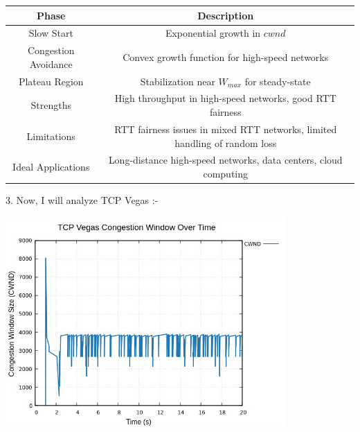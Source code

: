 \documentclass[11pt,a4paper]{article}
\begin{document}
\begin{center}
    \begin{tabular}{|c|c|}
        \hline
        \textbf{Phase} & \textbf{Description} \\
        \hline
        Slow Start & Exponential growth in $cwnd$ \\
        Congestion Avoidance & Convex growth function for high-speed networks \\
        Plateau Region & Stabilization near $W_{max}$ for steady-state \\
        Strengths & High throughput in high-speed networks, good RTT fairness \\
        Limitations & RTT fairness issues in mixed RTT networks, limited handling of random loss \\
        Ideal Applications & Long-distance high-speed networks, data centers, cloud computing \\
        \hline
    \end{tabular}
\end{center}


3. Now, I will analyze TCP Vegas :-
\begin{center}
    \includegraphics[width=0.8\textwidth]{images/vegas_cwnd.jpg}
\end{center}
\end{document}
